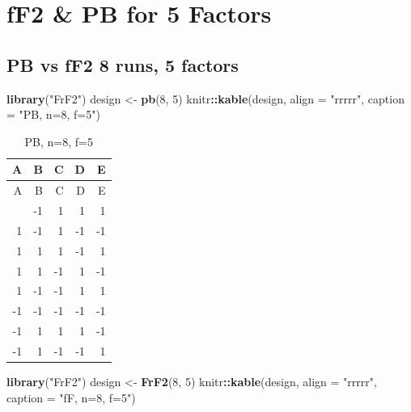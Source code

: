 \documentclass[
  12pt,
  a4paper,
]{article}
\newenvironment{Shaded}{\begin{snugshade}}{\end{snugshade}}
\newcommand{\AttributeTok}[1]{\textcolor[rgb]{0.13,0.29,0.53}{#1}}
\newcommand{\DecValTok}[1]{\textcolor[rgb]{0.00,0.00,0.81}{#1}}
\newcommand{\FunctionTok}[1]{\textcolor[rgb]{0.13,0.29,0.53}{\textbf{#1}}}
\newcommand{\NormalTok}[1]{#1}
\newcommand{\OtherTok}[1]{\textcolor[rgb]{0.56,0.35,0.01}{#1}}
\newcommand{\SpecialCharTok}[1]{\textcolor[rgb]{0.81,0.36,0.00}{\textbf{#1}}}
\newcommand{\StringTok}[1]{\textcolor[rgb]{0.31,0.60,0.02}{#1}}
\numberwithin{equation}{section}
\theoremstyle{plain}
\theoremstyle{definition}
\theoremstyle{remark}
\theoremstyle{note}
\begin{document}
\newpage

\hypertarget{ff2-pb-for-5-factors}{%
\section{fF2 \& PB for 5 Factors}\label{ff2-pb-for-5-factors}}

\hypertarget{pb-vs-ff2-8-runs-5-factors}{%
\subsection{PB vs fF2 8 runs, 5
factors}\label{pb-vs-ff2-8-runs-5-factors}}

\begin{Shaded}
\begin{Highlighting}[]
\FunctionTok{library}\NormalTok{(}\StringTok{"FrF2"}\NormalTok{)}
\NormalTok{design }\OtherTok{\textless{}{-}} \FunctionTok{pb}\NormalTok{(}\DecValTok{8}\NormalTok{, }\DecValTok{5}\NormalTok{)}
\NormalTok{knitr}\SpecialCharTok{::}\FunctionTok{kable}\NormalTok{(design, }\AttributeTok{align =} \StringTok{"rrrrr"}\NormalTok{, }\AttributeTok{caption =} \StringTok{"PB, n=8, f=5"}\NormalTok{)}
\end{Highlighting}
\end{Shaded}

\begin{longtable}[]{@{}rrrrr@{}}
\caption{PB, n=8, f=5}\tabularnewline
\toprule\noalign{}
A & B & C & D & E \\
\midrule\noalign{}
\endfirsthead
\toprule\noalign{}
A & B & C & D & E \\
\midrule\noalign{}
\endhead
\bottomrule\noalign{}
\endlastfoot
-1 & -1 & 1 & 1 & 1 \\
1 & -1 & 1 & -1 & -1 \\
1 & 1 & 1 & -1 & 1 \\
1 & 1 & -1 & 1 & -1 \\
1 & -1 & -1 & 1 & 1 \\
-1 & -1 & -1 & -1 & -1 \\
-1 & 1 & 1 & 1 & -1 \\
-1 & 1 & -1 & -1 & 1 \\
\end{longtable}

\begin{Shaded}
\begin{Highlighting}[]
\FunctionTok{library}\NormalTok{(}\StringTok{"FrF2"}\NormalTok{)}
\NormalTok{design }\OtherTok{\textless{}{-}} \FunctionTok{FrF2}\NormalTok{(}\DecValTok{8}\NormalTok{, }\DecValTok{5}\NormalTok{)}
\NormalTok{knitr}\SpecialCharTok{::}\FunctionTok{kable}\NormalTok{(design, }\AttributeTok{align =} \StringTok{"rrrrr"}\NormalTok{, }\AttributeTok{caption =} \StringTok{"fF, n=8, f=5"}\NormalTok{)}
\end{Highlighting}
\end{Shaded}
\end{document}
